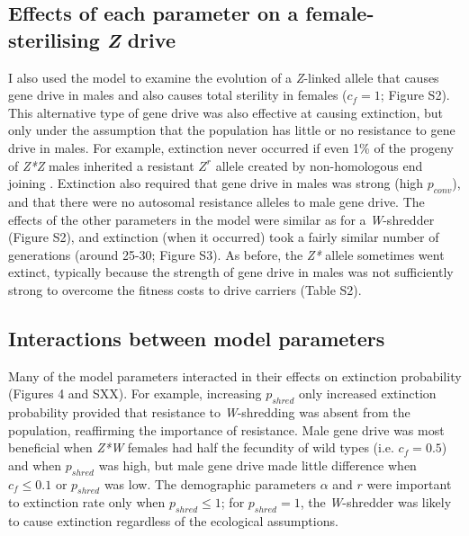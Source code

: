 \documentclass[]{rsos}%
\begin{document}
\hypertarget{effects-of-each-parameter-on-a-female-sterilising-z-drive}{%
\subsection{\texorpdfstring{Effects of each parameter on a
female-sterilising \emph{Z}
drive}{Effects of each parameter on a female-sterilising Z drive}}\label{effects-of-each-parameter-on-a-female-sterilising-z-drive}}

I also used the model to examine the evolution of a \emph{Z}-linked
allele that causes gene drive in males and also causes total sterility
in females (\(c_f = 1\); Figure S2). This alternative type of gene drive
was also effective at causing extinction, but only under the assumption
that the population has little or no resistance to gene drive in males.
For example, extinction never occurred if even 1\% of the progeny of
\emph{Z*Z} males inherited a resistant \(Z^r\) allele created by
non-homologous end joining \citep[c.f.][]{unckless2017ev}. Extinction
also required that gene drive in males was strong (high \(p_{conv}\)),
and that there were no autosomal resistance alleles to male gene drive.
The effects of the other parameters in the model were similar as for a
\emph{W}-shredder (Figure S2), and extinction (when it occurred) took a
fairly similar number of generations (around 25-30; Figure S3). As
before, the \emph{Z*} allele sometimes went extinct, typically because
the strength of gene drive in males was not sufficiently strong to
overcome the fitness costs to drive carriers (Table S2).

\hypertarget{interactions-between-model-parameters}{%
\subsection{Interactions between model
parameters}\label{interactions-between-model-parameters}}

Many of the model parameters interacted in their effects on extinction
probability (Figures 4 and SXX). For example, increasing \(p_{shred}\)
only increased extinction probability provided that resistance to
\emph{W}-shredding was absent from the population, reaffirming the
importance of resistance. Male gene drive was most beneficial when
\emph{Z*W} females had half the fecundity of wild types (i.e.
\(c_f = 0.5\)) and when \(p_{shred}\) was high, but male gene drive made
little difference when \(c_f \le 0.1\) or \(p_{shred}\) was low. The
demographic parameters \(\alpha\) and \(r\) were important to extinction
rate only when \(p_{shred} \le 1\); for \(p_{shred} = 1\), the
\emph{W}-shredder was likely to cause extinction regardless of the
ecological assumptions.
\end{document}

